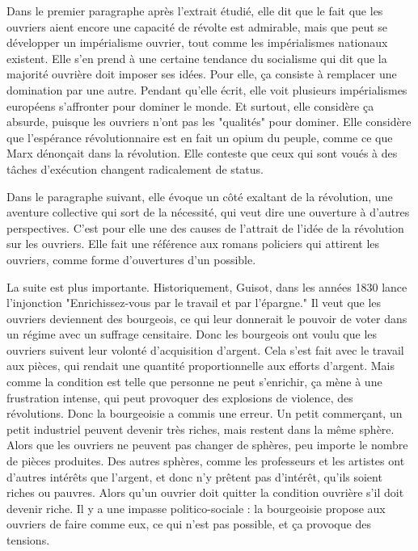 \documentclass[a4paper,12pt]{book}
\begin{document}
\par Dans le premier paragraphe après l'extrait étudié, elle dit que le fait que les ouvriers aient encore une capacité de révolte est admirable, mais que peut se développer un impérialisme ouvrier, tout comme les impérialismes nationaux existent. Elle s'en prend à une certaine tendance du socialisme qui dit que la majorité ouvrière doit imposer ses idées. Pour elle, ça consiste à remplacer une domination par une autre. Pendant qu'elle écrit, elle voit plusieurs impérialismes européens s'affronter pour dominer le monde. Et surtout, elle considère ça absurde, puisque les ouvriers n'ont pas les "qualités" pour dominer. Elle considère que l'espérance révolutionnaire est en fait un opium du peuple, comme ce que Marx dénonçait dans la révolution. Elle conteste que ceux qui sont voués à des tâches d'exécution changent radicalement de status.
\par Dans le paragraphe suivant, elle évoque un côté exaltant de la révolution, une aventure collective qui sort de la nécessité, qui veut dire une ouverture à d'autres perspectives. C'est pour elle une des causes de l'attrait de l'idée de la révolution sur les ouvriers. Elle fait une référence aux romans policiers qui attirent les ouvriers, comme forme d'ouvertures d'un possible.
\par La suite est plus importante. Historiquement, Guisot, dans les années 1830 lance l'injonction "Enrichissez-vous par le travail et par l'épargne." Il veut que les ouvriers deviennent des bourgeois, ce qui leur donnerait le pouvoir de voter dans un régime avec un suffrage censitaire. Donc les bourgeois ont voulu que les ouvriers suivent leur volonté d'acquisition d'argent. Cela s'est fait avec le travail aux pièces, qui rendait une quantité proportionnelle aux efforts d'argent. Mais comme la condition est telle que personne ne peut s'enrichir, ça mène à une frustration intense, qui peut provoquer des explosions de violence, des révolutions. Donc la bourgeoisie a commis une erreur. Un petit commerçant, un petit industriel peuvent devenir très riches, mais restent dans la même sphère. Alors que les ouvriers ne peuvent pas changer de sphères, peu importe le nombre de pièces produites. Des autres sphères, comme les professeurs et les artistes ont d'autres intérêts que l'argent, et donc n'y prêtent pas d'intérêt, qu'ils soient riches ou pauvres. Alors qu'un ouvrier doit quitter la condition ouvrière s'il doit devenir riche. Il y a une impasse politico-sociale : la bourgeoisie propose aux ouvriers de faire comme eux, ce qui n'est pas possible, et ça provoque des tensions.
\end{document}
